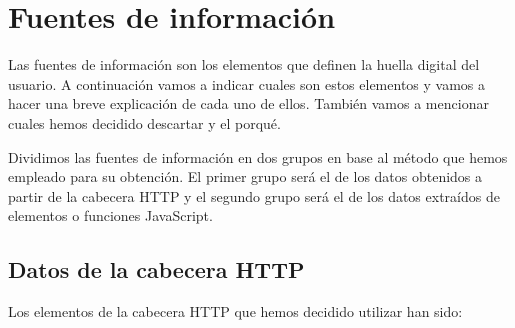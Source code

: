 \chapter{Fuentes de información}
Las fuentes de información son los elementos que definen la huella digital del usuario. A continuación vamos a indicar cuales son estos elementos y vamos a hacer una breve explicación de cada uno de ellos. También vamos a mencionar cuales hemos decidido descartar y el porqué.\par
Dividimos las fuentes de información en dos grupos en base al método que hemos empleado para su obtención. El primer grupo será el de los datos obtenidos a partir de la cabecera HTTP y el segundo grupo será el de los datos extraídos de elementos o funciones JavaScript.
\section{Datos de la cabecera HTTP}
\noindent Los elementos de la cabecera HTTP que hemos decidido utilizar han sido:
